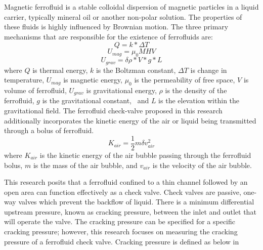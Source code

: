 \documentclass[]{asme2ej}
\begin{document}
Magnetic ferrofluid is a stable colloidal dispersion of magnetic particles in a liquid carrier,
typically mineral oil or another non-polar solution. The properties of these fluids is highly
influenced by Brownian motion\cite{Rosensweig, R.E. (1985) Ferrohydrodynamics. Cambridge University Press, Cambridge.}.
The three primary mechanisms that are responsible for the existence of ferrofluids are:
\begin{equation}
  Q = k * \Delta T
\end{equation}
\begin{equation}
  U_{mag} = {\mu}_{0}MHV
\end{equation}
\begin{equation}
  U_{grav} = {\delta}{\rho}*V*g*L
\end{equation}
where $Q$ is thermal energy, $k$ is the Boltzman constant, $\Delta{T}$ is change in temperature, 
$U_{mag}$ is magnetic energy, ${\mu}_{0}$ is the permeability of free space, $V$ is volume of ferrofluid,
$U_{grav}$ is gravitational energy, $\rho$ is the density of the ferrofluid, $g$ is the gravitational constant, \
and $L$ is the elevation within the gravitational field. The ferrofluid check-valve proposed in
this research additionally incorporates the kinetic energy of the air or liquid being transmitted through
a bolus of ferrofluid.
\begin{equation}
  K_{air} = \frac{1}{2}m{\delta}v_{air}^{2}
\end{equation}
where $K_{air}$ is the kinetic energy of the air bubble passing through the ferrofluid bolus,
$m$ is the mass of the air bubble, and $v_{air}$ is the velocity of the air bubble.

This research posits that a ferrofluid confined to a thin channel followed by an open area can function
effectively as a check valve. Check valves are passive, one-way valves which prevent the backflow of liquid. 
There is a minimum differential upstream pressure, known as cracking pressure, between the inlet and outlet 
that will operate the valve. The cracking pressure can be specified for a specific cracking pressure; however, 
this research focuses on measuring the cracking pressure of a ferrofluid check valve. Cracking pressure is defined as
below in %
\end{document}
